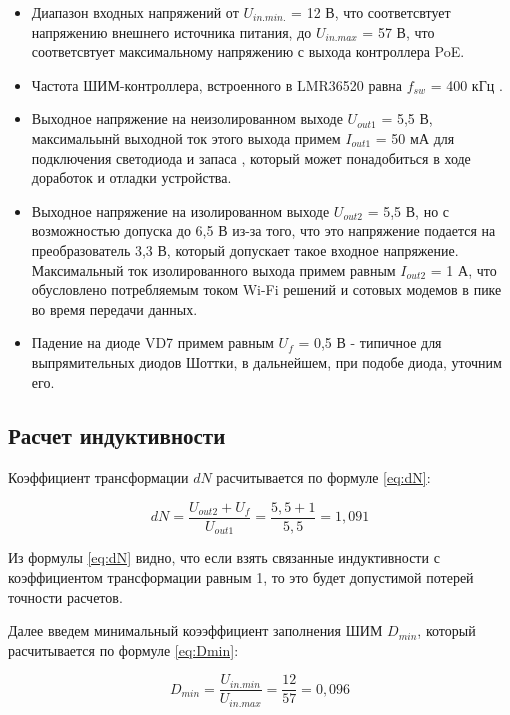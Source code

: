 \begin{itemize}
    \item Диапазон входных напряжений от $U_{in.min.}$ = 12 В, что соответсвтует напряжению
    внешнего источника питания, до $U_{in.max}$ = 57 В, что соответсвтует максимальному
    напряжению с выхода контроллера PoE. 
    \item Частота ШИМ-контроллера, встроенного в LMR36520 равна $f_{sw}$ = 400 кГц 
    \cite{LMR36520:datasheet}. 
    \item Выходное напряжение на неизолированном выходе $U_{out1}$ = 5,5 В, максимальынй 
    выходной ток этого выхода примем $I_{out1}$ = 50 мА для подключения светодиода и запаса 
    , который может понадобиться в ходе доработок и отладки устройства. 
    \item Выходное напряжение на изолированном выходе $U_{out2}$ = 5,5 В, но с возможностью допуска
    до 6,5 В из-за того, что это напряжение подается на преобразователь 3,3 В, который допускает 
    такое входное напряжение. Максимальный ток изолированного выхода примем равным $I_{out2}$ = 1 А,
    что обусловлено потребляемым током Wi-Fi решений и сотовых модемов в пике во время передачи 
    данных. 
    \item Падение на диоде VD7 примем равным $U_{f}$ = 0,5 В - типичное для выпрямительных диодов Шоттки, 
    в дальнейшем, при подобе диода, уточним его.
    
\end{itemize}

\subsection{Расчет индуктивности}
\hspace{1cm} 

Коэффициент трансформации $dN$ расчитывается по формуле \ref{eq:dN}:

\begin{equation}
    dN = \frac{U_{out2} + U_{f}}{ U_{out1}} = \frac{5,5 + 1}{5,5} = 1,091
    \label{eq:dN}
\end{equation}

Из формулы \ref{eq:dN} видно, что если взять связанные индуктивности с коэффициентом 
трансформации равным 1, то это будет допустимой потерей точности расчетов. 

Далее введем минимальный коээффициент заполнения ШИМ $D_{min}$, который расчитывается по 
формуле \ref{eq:Dmin}:

\begin{equation}
    D_{min} = \frac{U_{in.min}}{U_{in.max}} = \frac{12}{57} = 0,096
    \label{eq:Dmin}
\end{equation}

